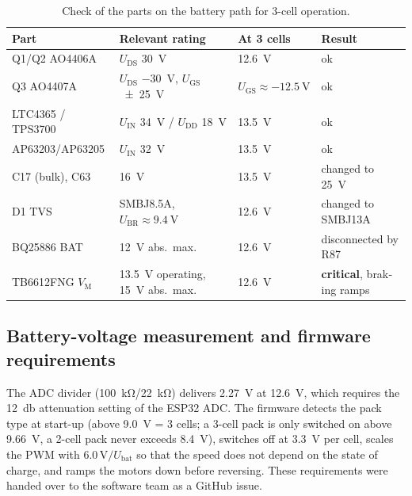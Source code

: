 \begin{otherlanguage}{english}
\begin{table}[htbp]
  \centering\small
  \caption{Check of the parts on the battery path for 3-cell operation.}
  \label{tab:hw_ratings}
  \begin{tabular}{@{}llll@{}}
    \toprule
    \textbf{Part} & \textbf{Relevant rating} & \textbf{At 3 cells} & \textbf{Result} \\
    \midrule
    Q1/Q2 AO4406A & $U_\text{DS}$ \SI{30}{\volt} & \SI{12.6}{\volt} & ok \\
    Q3 AO4407A & $U_\text{DS}$ \SI{-30}{\volt}, $U_\text{GS}$ \SI{\pm 25}{\volt} & $U_\text{GS}\approx\SI{-12.5}{\volt}$ & ok \\
    LTC4365 / TPS3700 & $U_\text{IN}$ \SI{34}{\volt} / $U_\text{DD}$ \SI{18}{\volt} & \SI{13.5}{\volt} & ok \\
    AP63203/AP63205 & $U_\text{IN}$ \SI{32}{\volt} & \SI{13.5}{\volt} & ok \\
    C17 (bulk), C63 & \SI{16}{\volt} & \SI{13.5}{\volt} & changed to \SI{25}{\volt} \\
    D1 TVS & SMBJ8.5A, $U_\text{BR}\approx\SI{9.4}{\volt}$ & \SI{12.6}{\volt} & changed to SMBJ13A \\
    BQ25886 BAT & \SI{12}{\volt} abs.\ max. & \SI{12.6}{\volt} & disconnected by R87 \\
    TB6612FNG $V_\text{M}$ & \SI{13.5}{\volt} operating, \SI{15}{\volt} abs.\ max. & \SI{12.6}{\volt} & \textbf{critical}, braking ramps \\
    \bottomrule
  \end{tabular}
\end{table}

\subsection{Battery-voltage measurement and firmware requirements}
The ADC divider (\SI{100}{\kilo\ohm}/\SI{22}{\kilo\ohm}) delivers \SI{2.27}{\volt} at \SI{12.6}{\volt}, which
requires the \SI{12}{\decibel} attenuation setting of the ESP32 ADC. The firmware detects the pack type at
start-up (above \SI{9.0}{\volt} = 3 cells; a 3-cell pack is only switched on above \SI{9.66}{\volt}, a
2-cell pack never exceeds \SI{8.4}{\volt}), switches off at \SI{3.3}{\volt} per cell, scales the PWM with
$6.0\,\text{V}/U_\text{bat}$ so that the speed does not depend on the state of charge, and ramps the
motors down before reversing. These requirements were handed over to the software team as a GitHub issue.


\end{otherlanguage}
